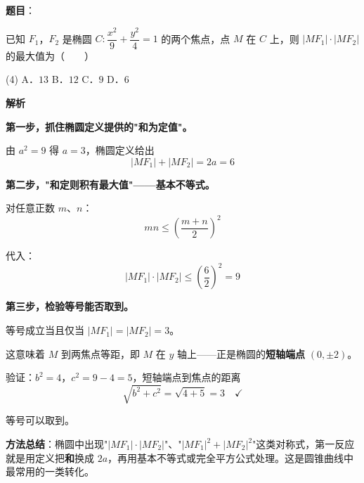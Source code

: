 \begin{answer}

\textbf{题目}：

已知 $F_1$，$F_2$ 是椭圆 $C:\dfrac{x^{2}}9+\dfrac{y^{2}}4=1$ 的两个焦点，点 $M$ 在 $C$ 上，则 $\left|MF_1\right|\cdot\left|MF_2\right|$ 的最大值为\mbox{（　　）}

\begin{gkopts}(4)
\task A．$13$
\task B．$12$
\task C．$9$
\task D．$6$
\end{gkopts}

\textbf{解析}

\textbf{第一步，抓住椭圆定义提供的"和为定值"。}

由 $a^{2}=9$ 得 $a=3$，椭圆定义给出
\nopagebreak[4]
\[\left|MF_1\right|+\left|MF_2\right|=2a=6\]

\textbf{第二步，"和定则积有最大值"——基本不等式。}

对任意正数 $m$、$n$：
\nopagebreak[4]
\[mn\le\left(\frac{m+n}2\right)^{2}\]

代入：
\nopagebreak[4]
\[\left|MF_1\right|\cdot\left|MF_2\right|\le\left(\frac62\right)^{2}=9\]

\textbf{第三步，检验等号能否取到。}

等号成立当且仅当 $\left|MF_1\right|=\left|MF_2\right|=3$。

这意味着 $M$ 到两焦点等距，即 $M$ 在 $y$ 轴上——正是椭圆的\textbf{短轴端点} $(0,\pm2)$。

验证：$b^{2}=4$，$c^{2}=9-4=5$，短轴端点到焦点的距离
\nopagebreak[4]
\[\sqrt{b^{2}+c^{2}}=\sqrt{4+5}=3\quad\checkmark\]

等号可以取到。

\begin{gktip}
\textbf{方法总结}：椭圆中出现"$\left|MF_1\right|\cdot\left|MF_2\right|$"、"$\left|MF_1\right|^{2}+\left|MF_2\right|^{2}$"这类对称式，第一反应就是用定义把\textbf{和}换成 $2a$，再用基本不等式或完全平方公式处理。这是圆锥曲线中最常用的一类转化。
\end{gktip}


\par\medskip

\end{answer}
